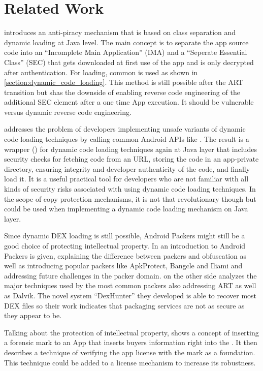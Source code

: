 \chapter{Related Work}\label{chapter:related_workd}
\parencite{anti_piracy} introduces an anti-piracy mechanism that is based on class
separation and dynamic loading at Java level. The main concept is to separate the app source code into an ``Incomplete Main Application'' (IMA) and a ``Seperate Essential Class'' (SEC) that gets downloaded at first use of the app and is only decrypted after authentication. For loading, common  is used as shown in
\autoref{section:dynamic_code_loading}. This method is still possible after the ART transition but shas the downside of enabling reverse code engineering of the additional SEC
element after a one time App execution. It should be vulnerable versus dynamic reverse code engineering.

\parencite{grab_n_run} addresses the problem of developers implementing unsafe variants of dynamic code loading techniques by calling common Android APIs like . The result is a wrapper () for dynamic code loading techniques again at Java layer that includes security checks for fetching code from an URL, storing the code in an app-private directory, ensuring integrity and developer authenticity of the code, and finally load it. It is a useful practical tool for developers who are not familiar with all kinds of security risks associated with using dynamic code loading techniques. In the scope of copy protection mechanisms, it is not that revolutionary though but could be used when implementing a dynamic code loading mechanism on Java layer.

Since dynamic DEX loading is still possible, Android Packers might still be a
good choice of protecting intellectual property. In \parencite{android_packer}
an introduction to Android Packers is given, explaining the difference between
packers and obfuscation as well as introducing popular packers like ApkProtect,
Bangcle and Iliami and addressing future challenges in the packer domain.
\parencite{dexhunter} on the other side analyzes the major techniques
used by the most common packers also addressing ART as well as Dalvik.
The novel system ``DexHunter'' they developed is able to recover most DEX files so
their work indicates that packaging services are not as secure as they appear to be.

Talking about the protection of intellectual property, \parencite{forensic_mark}
shows a concept of inserting a forensic mark to an App that inserts buyers
information right into the . It then describes a technique
of verifying the app license with the mark as a foundation. This technique could be added to a license mechanism to increase its robustness.

